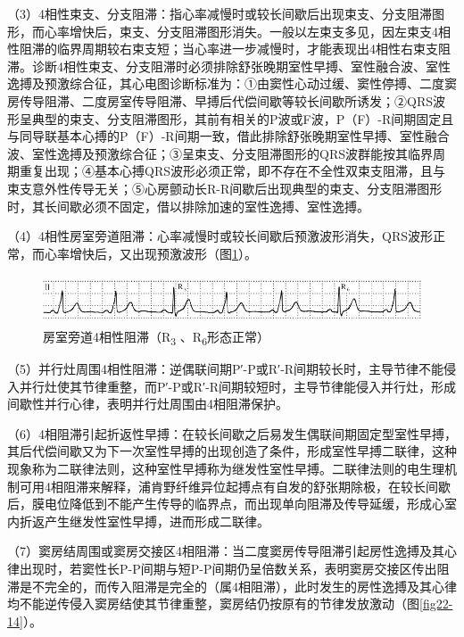 （3）4相性束支、分支阻滞：指心率减慢时或较长间歇后出现束支、分支阻滞图形，而心率增快后，束支、分支阻滞图形消失。一般以左束支多见，因左束支4相性阻滞的临界周期较右束支短；当心率进一步减慢时，才能表现出4相性右束支阻滞。诊断4相性束支、分支阻滞时必须排除舒张晚期室性早搏、室性融合波、室性逸搏及预激综合征，其心电图诊断标准为：①由窦性心动过缓、窦性停搏、二度窦房传导阻滞、二度房室传导阻滞、早搏后代偿间歇等较长间歇所诱发；②QRS波形呈典型的束支、分支阻滞图形，其前有相关的P波或F波，P（F）-R间期固定且与同导联基本心搏的P（F）-R间期一致，借此排除舒张晚期室性早搏、室性融合波、室性逸搏及预激综合征；③呈束支、分支阻滞图形的QRS波群能按其临界周期重复出现；④基本心搏QRS波形必须正常，即不存在不全性双束支阻滞，且与束支意外性传导无关；⑤心房颤动长R-R间歇后出现典型的束支、分支阻滞图形时，其长间歇必须不固定，借以排除加速的室性逸搏、室性逸搏。

（4）4相性房室旁道阻滞：心率减慢时或较长间歇后预激波形消失，QRS波形正常，而心率增快后，又出现预激波形（图\ref{fig22-13}）。

\begin{figure}[!htbp]
 \centering
 \includegraphics[width=5.60417in,height=0.57292in]{./images/Image00379.jpg}
 \captionsetup{justification=centering}
 \caption{房室旁道4相性阻滞（R\textsubscript{3} 、R\textsubscript{6}形态正常）}
 \label{fig22-13}
  \end{figure} 


（5）并行灶周围4相性阻滞：逆偶联间期P′-P或R′-R间期较长时，主导节律不能侵入并行灶使其节律重整，而P′-P或R′-R间期较短时，主导节律能侵入并行灶，形成间歇性并行心律，表明并行灶周围由4相阻滞保护。

（6）4相阻滞引起折返性早搏：在较长间歇之后易发生偶联间期固定型室性早搏，其后代偿间歇又为下一次室性早搏的出现创造了条件，形成室性早搏二联律，这种现象称为二联律法则，这种室性早搏称为继发性室性早搏。二联律法则的电生理机制可用4相阻滞来解释，浦肯野纤维异位起搏点有自发的舒张期除极，在较长间歇后，膜电位降低到不能产生传导的临界点，而出现单向阻滞及传导延缓，形成心室内折返产生继发性室性早搏，进而形成二联律。

（7）窦房结周围或窦房交接区4相阻滞：当二度窦房传导阻滞引起房性逸搏及其心律出现时，若窦性长P-P间期与短P-P间期仍呈倍数关系，表明窦房交接区传出阻滞是不完全的，而传入阻滞是完全的（属4相阻滞），此时发生的房性逸搏及其心律均不能逆传侵入窦房结使其节律重整，窦房结仍按原有的节律发放激动（图\ref{fig22-14}）。

